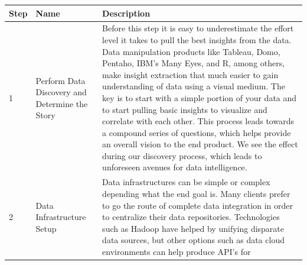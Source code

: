\documentclass[]{book}
\theoremstyle{definition}
\theoremstyle{definition}
\theoremstyle{definition}
\theoremstyle{remark}
\begin{document}
\begin{longtable}[]{@{}lll@{}}
\toprule
\begin{minipage}[b]{0.04\columnwidth}\raggedright\strut
\textbf{Step}\strut
\end{minipage} & \begin{minipage}[b]{0.11\columnwidth}\raggedright\strut
\textbf{Name}\strut
\end{minipage} & \begin{minipage}[b]{0.76\columnwidth}\raggedright\strut
\textbf{Description}\strut
\end{minipage}\tabularnewline
\midrule
\endhead
\begin{minipage}[t]{0.04\columnwidth}\raggedright\strut
1\strut
\end{minipage} & \begin{minipage}[t]{0.11\columnwidth}\raggedright\strut
Perform Data Discovery and Determine the Story\strut
\end{minipage} & \begin{minipage}[t]{0.76\columnwidth}\raggedright\strut
Before this step it is easy to underestimate the effort level it takes
to pull the best insights from the data. Data manipulation products like
Tableau, Domo, Pentaho, IBM's Many Eyes, and R, among others, make
insight extraction that much easier to gain understanding of data using
a visual medium. The key is to start with a simple portion of your data
and to start pulling basic insights to visualize and correlate with each
other. This process leads towards a compound series of questions, which
helps provide an overall vision to the end product. We see the effect
during our discovery process, which leads to unforeseen avenues for data
intelligence.\strut
\end{minipage}\tabularnewline
\begin{minipage}[t]{0.04\columnwidth}\raggedright\strut
2\strut
\end{minipage} & \begin{minipage}[t]{0.11\columnwidth}\raggedright\strut
Data Infrastructure Setup\strut
\end{minipage} & \begin{minipage}[t]{0.76\columnwidth}\raggedright\strut
Data infrastructures can be simple or complex depending what the end
goal is. Many clients prefer to go the route of complete data
integration in order to centralize their data repositories. Technologies
such as Hadoop have helped by unifying disparate data sources, but other
options such as data cloud environments can help produce API's for

\end{minipage}
\end{longtable}
\end{document}
